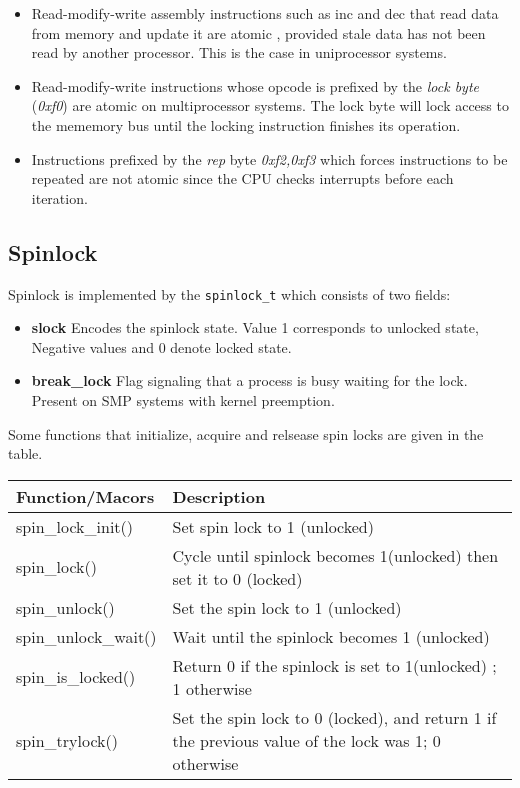 \documentclass{article}
\begin{document}
\begin{itemize}
  \item Read-modify-write assembly instructions such as inc and dec
    that read data from memory and update it are atomic , provided
    stale data has not been read by another processor. This is the
    case in uniprocessor systems.

  \item Read-modify-write instructions whose opcode is prefixed by the
    \emph{lock byte} (\emph{0xf0}) are atomic on multiprocessor
    systems.  The lock byte will lock access to the mememory bus until
    the locking instruction finishes its operation.
  \item Instructions prefixed by the \emph{rep} byte \emph{0xf2,0xf3}
    which forces instructions to be repeated are not atomic since the
    CPU checks interrupts before each iteration.

\end{itemize}



\subsection{Spinlock}

Spinlock is implemented by the \lstinline{spinlock_t} which consists
of two fields:

\begin{itemize}
  \item \textbf{slock} Encodes the spinlock state. Value 1 corresponds
    to unlocked state, Negative values and 0 denote locked state.
  
  \item \textbf{break\_lock} Flag signaling that a process is busy
    waiting for the lock. Present on SMP systems with kernel
    preemption.    
\end{itemize}


Some functions that initialize, acquire and relsease spin locks are
given in the table.

  \begin{center}
  \begin{tabular}{ |l | p{7cm}| }    
    \hline
    Function/Macors & Description \\ \hline
    spin\_lock\_init() & Set spin lock to 1 (unlocked) \\
    \hline
    spin\_lock() &
    Cycle until spinlock becomes 1(unlocked) then set it to 0 (locked) \\
    \hline
    spin\_unlock() & Set the spin lock to 1 (unlocked) \\
    \hline
    spin\_unlock\_wait() & Wait until the spinlock becomes 1 (unlocked)  \\
    \hline
    spin\_is\_locked() & Return 0 if the spinlock is set to 1(unlocked) ; 1 otherwise  \\
    \hline
    spin\_trylock() &  Set the spin lock to 0 (locked), and return 1 if the previous value of the lock was 1; 0 otherwise\\
    \hline
  \end{tabular}
  \end{center}
\end{document}
